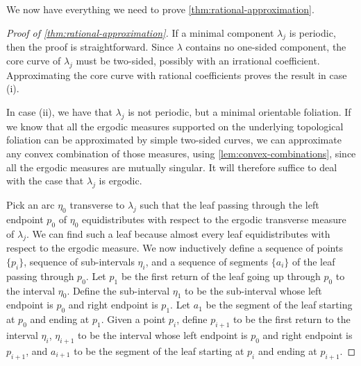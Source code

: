 \documentclass[12pt, reqno]{amsart}
\begin{document}
We now have everything we need to prove \autoref{thm:rational-approximation}.
\begin{proof}[Proof of \autoref{thm:rational-approximation}]
  If a minimal component $\lambda_j$ is periodic, then the proof is straightforward.
  Since $\lambda$ contains no one-sided component, the core curve of $\lambda_j$ must be two-sided, possibly with an irrational coefficient.
  Approximating the core curve with rational coefficients proves the result in case (i).

  In case (ii), we have that $\lambda_j$ is not periodic, but a minimal orientable foliation.
  If we know that all the ergodic measures supported on the underlying topological foliation can be approximated by simple two-sided curves, we can approximate any convex combination of those measures, using \autoref{lem:convex-combinations}, since all the ergodic measures are mutually singular.
  It will therefore suffice to deal with the case that $\lambda_j$ is ergodic.

  Pick an arc $\eta_0$ transverse to $\lambda_j$ such that the leaf passing through the left endpoint $p_0$ of $\eta_0$ equidistributes with respect to the ergodic transverse measure of $\lambda_j$.
  We can find such a leaf because almost every leaf equidistributes with respect to the ergodic measure.
  We now inductively define a sequence of points $\{p_i\}$, sequence of sub-intervals $\eta_i$, and a sequence of segments $\{a_i\}$ of the leaf passing through $p_0$.
  Let $p_1$ be the first return of the leaf going up through $p_0$ to the interval $\eta_0$.
  Define the sub-interval $\eta_1$ to be the sub-interval whose left endpoint is $p_0$ and right endpoint is $p_1$.
  Let $a_1$ be the segment of the leaf starting at $p_0$ and ending at $p_1$.
  Given a point $p_i$, define $p_{i+1}$ to be the first return to the interval $\eta_{i}$, $\eta_{i+1}$ to be the interval whose left endpoint is $p_0$ and right endpoint is $p_{i+1}$, and $a_{i+1}$ to be the segment of the leaf starting at $p_i$ and ending at $p_{i+1}$.


\end{proof}
\end{document}
